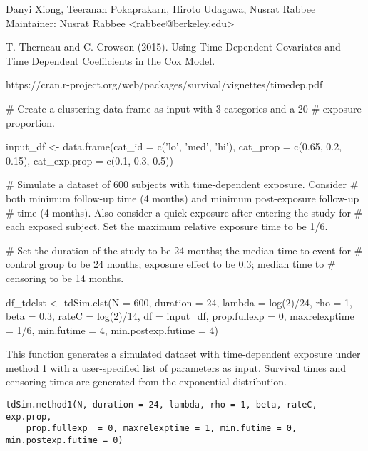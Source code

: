 \documentclass[a4paper]{book}
\begin{document}
%
\begin{Author}\relax
Danyi Xiong, Teeranan Pokaprakarn, Hiroto Udagawa, Nusrat Rabbee \\{}
Maintainer: Nusrat Rabbee <rabbee@berkeley.edu>
\end{Author}
%
\begin{References}\relax
T. Therneau and C. Crowson (2015). Using Time Dependent Covariates and Time Dependent Coefficients in the Cox Model.

https://cran.r-project.org/web/packages/survival/vignettes/timedep.pdf
\end{References}
%
\begin{Examples}
\begin{ExampleCode}
# Create a clustering data frame as input with 3 categories and a 20%
# exposure proportion.
  
input_df <- data.frame(cat_id = c('lo', 'med', 'hi'), 
	cat_prop = c(0.65, 0.2, 0.15), cat_exp.prop = c(0.1, 0.3, 0.5))

# Simulate a dataset of 600 subjects with time-dependent exposure. Consider
# both minimum follow-up time (4 months) and minimum post-exposure follow-up
# time (4 months). Also consider a quick exposure after entering the study for
# each exposed subject. Set the maximum relative exposure time to be 1/6. 

# Set the duration of the study to be 24 months; the median time to event for
# control group to be 24 months; exposure effect to be 0.3; median time to
# censoring to be 14 months.

df_tdclst <- tdSim.clst(N = 600, duration = 24, lambda = log(2)/24, rho = 1,
    beta = 0.3, rateC = log(2)/14, df = input_df, prop.fullexp = 0,
    maxrelexptime = 1/6, min.futime = 4, min.postexp.futime = 4)
\end{ExampleCode}
\end{Examples}
%
\begin{Description}\relax

This function generates a simulated dataset with time-dependent exposure under  
method 1 with a user-specified list of parameters as input. Survival times and censoring times are generated from the exponential distribution.
\end{Description}
%
\begin{Usage}
\begin{verbatim}
tdSim.method1(N, duration = 24, lambda, rho = 1, beta, rateC, exp.prop, 
    prop.fullexp  = 0, maxrelexptime = 1, min.futime = 0, min.postexp.futime = 0)
\end{verbatim}
\end{Usage}
\end{document}
